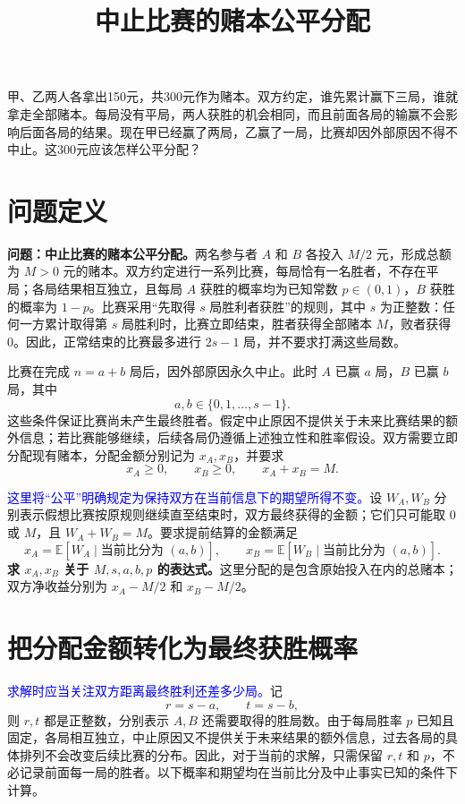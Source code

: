 \documentclass[UTF8,12pt,a4paper,fontset=fandol]{ctexart}
\title{中止比赛的赌本公平分配}
\author{}
\date{}
\begin{document}
\maketitle

甲、乙两人各拿出150元，共300元作为赌本。双方约定，谁先累计赢下三局，谁就拿走全部赌本。每局没有平局，两人获胜的机会相同，而且前面各局的输赢不会影响后面各局的结果。现在甲已经赢了两局，乙赢了一局，比赛却因外部原因不得不中止。这300元应该怎样公平分配？

\section{问题定义}
\label{sec:points-problem}

\textbf{问题：中止比赛的赌本公平分配。}两名参与者 \(A\) 和 \(B\) 各投入 \(M/2\) 元，形成总额为 \(M>0\) 元的赌本。双方约定进行一系列比赛，每局恰有一名胜者，不存在平局；各局结果相互独立，且每局 \(A\) 获胜的概率均为已知常数 \(p\in(0,1)\)，\(B\) 获胜的概率为 \(1-p\)。比赛采用“先取得 \(s\) 局胜利者获胜”的规则，其中 \(s\) 为正整数：任何一方累计取得第 \(s\) 局胜利时，比赛立即结束，胜者获得全部赌本 \(M\)，败者获得 \(0\)。因此，正常结束的比赛最多进行 \(2s-1\) 局，并不要求打满这些局数。

比赛在完成 \(n=a+b\) 局后，因外部原因永久中止。此时 \(A\) 已赢 \(a\) 局，\(B\) 已赢 \(b\) 局，其中
\[
a,b\in\{0,1,\ldots,s-1\}.
\]
这些条件保证比赛尚未产生最终胜者。假定中止原因不提供关于未来比赛结果的额外信息；若比赛能够继续，后续各局仍遵循上述独立性和胜率假设。双方需要立即分配现有赌本，分配金额分别记为 \(x_A,x_B\)，并要求
\[
x_A\ge 0,\qquad x_B\ge 0,\qquad x_A+x_B=M.
\]

\textcolor{blue}{这里将“公平”明确规定为保持双方在当前信息下的期望所得不变。}设 \(W_A,W_B\) 分别表示假想比赛按原规则继续直至结束时，双方最终获得的金额；它们只可能取 \(0\) 或 \(M\)，且 \(W_A+W_B=M\)。要求提前结算的金额满足
\[
x_A=\mathbb E[W_A\mid\text{当前比分为 }(a,b)],
\qquad
x_B=\mathbb E[W_B\mid\text{当前比分为 }(a,b)].
\]
\textbf{求 \(x_A,x_B\) 关于 \(M,s,a,b,p\) 的表达式。}这里分配的是包含原始投入在内的总赌本；双方净收益分别为 \(x_A-M/2\) 和 \(x_B-M/2\)。

\section{把分配金额转化为最终获胜概率}
\label{sec:points-reduction}

\textcolor{blue}{求解时应当关注双方距离最终胜利还差多少局。}记
\begin{equation}
  r=s-a,\qquad t=s-b,
  \label{eq:points-remaining}
\end{equation}
则 $r,t$ 都是正整数，分别表示 $A,B$ 还需要取得的胜局数。由于每局胜率 $p$ 已知且固定，各局相互独立，中止原因又不提供关于未来结果的额外信息，过去各局的具体排列不会改变后续比赛的分布。因此，对于当前的求解，只需保留 $r,t$ 和 $p$，不必记录前面每一局的胜者。以下概率和期望均在当前比分及中止事实已知的条件下计算。
\end{document}
